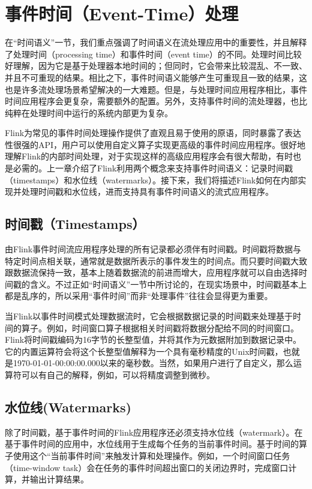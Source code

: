\documentclass[oneside]{ctexbook}
\begin{document}
\section{事件时间（Event-Time）处理}

在“时间语义”一节，我们重点强调了时间语义在流处理应用中的重要性，并且解释了处理时间（processing time）和事件时间（event time）的不同。处理时间比较好理解，因为它是基于处理器本地时间的；但同时，它会带来比较混乱、不一致、并且不可重现的结果。相比之下，事件时间语义能够产生可重现且一致的结果，这也是许多流处理场景希望解决的一大难题。但是，与处理时间应用程序相比，事件时间应用程序会更复杂，需要额外的配置。另外，支持事件时间的流处理器，也比纯粹在处理时间中运行的系统内部更为复杂。

Flink为常见的事件时间处理操作提供了直观且易于使用的原语，同时暴露了表达性很强的API，用户可以使用自定义算子实现更高级的事件时间应用程序。很好地理解Flink的内部时间处理，对于实现这样的高级应用程序会有很大帮助，有时也是必需的。上一章介绍了Flink利用两个概念来支持事件时间语义：记录时间戳（timestamps）和水位线（watermarks）。接下来，我们将描述Flink如何在内部实现并处理时间戳和水位线，进而支持具有事件时间语义的流式应用程序。

\subsection{时间戳（Timestamps）}

由Flink事件时间流应用程序处理的所有记录都必须伴有时间戳。时间戳将数据与特定时间点相关联，通常就是数据所表示的事件发生的时间点。而只要时间戳大致跟数据流保持一致，基本上随着数据流的前进而增大，应用程序就可以自由选择时间戳的含义。不过正如“时间语义”一节中所讨论的，在现实场景中，时间戳基本上都是乱序的，所以采用“事件时间”而非“处理事件”往往会显得更为重要。

当Flink以事件时间模式处理数据流时，它会根据数据记录的时间戳来处理基于时间的算子。例如，时间窗口算子根据相关时间戳将数据分配给不同的时间窗口。Flink将时间戳编码为16字节的长整型值，并将其作为元数据附加到数据记录中。它的内置运算符会将这个长整型值解释为一个具有毫秒精度的Unix时间戳，也就是1970-01-01-00:00:00.000以来的毫秒数。当然，如果用户进行了自定义，那么运算符可以有自己的解释，例如，可以将精度调整到微秒。

\subsection{水位线(Watermarks)}

除了时间戳，基于事件时间的Flink应用程序还必须支持水位线（watermark）。在基于事件时间的应用中，水位线用于生成每个任务的当前事件时间。基于时间的算子使用这个“当前事件时间”来触发计算和处理操作。例如，一个时间窗口任务（time-window task）会在任务的事件时间超出窗口的关闭边界时，完成窗口计算，并输出计算结果。
\end{document}
